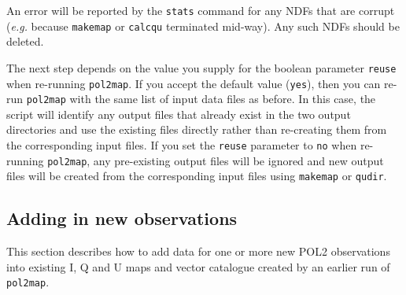 \documentclass[twoside,11pt]{starlink}
\begin{document}
An error will be reported by the \texttt{stats} command for any NDFs
that are corrupt (\emph{e.g.} because \texttt{makemap} or \texttt{calcqu}
terminated mid-way). Any such NDFs should be deleted.

The next step depends on the value you supply for the boolean parameter
\texttt{reuse} when re-running \texttt{pol2map}. If you accept the
default value (\texttt{yes}), then you can re-run \texttt{pol2map} with the
same list of input data files as before. In this case, the script will
identify any output files that already exist in the two output directories
and use the existing files directly rather than re-creating them from the
corresponding input files. If you set the \texttt{reuse} parameter to
\texttt{no} when re-running \texttt{pol2map}, any pre-existing output files
will be ignored and new output files will be created from the
corresponding input files using \texttt{makemap} or \texttt{qudir}.

\subsection{Adding in new observations\label{sec:addin}}
This section describes how to add data for one or more new POL2
observations into existing I, Q and U maps and vector catalogue created
by an earlier run of \texttt{pol2map}.
\end{document}
